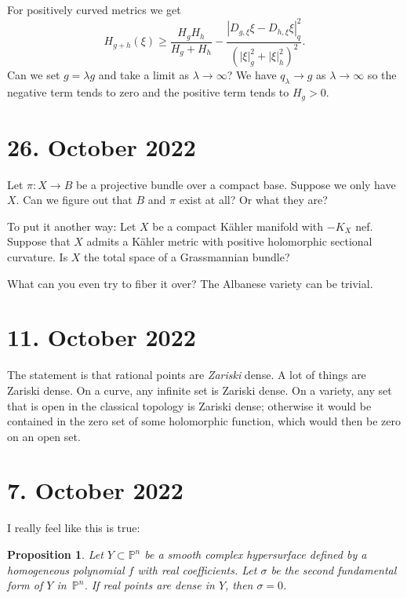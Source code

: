 \documentclass[11pt]{article}
\newtheorem{prop}[theo]{Proposition}
\theoremstyle{definition}
\newcommand{\kk}[1]{\mathbb{#1}}
\begin{document}
For positively curved metrics we get
\[
H_{g + h}(\xi)
\geq \frac{H_g H_h}{H_g + H_h}
- \frac{|D_{g,\xi}\xi - D_{h,\xi}\xi|^2_q}
{(|\xi|_g^2 + |\xi|_h^2)^2}.
\]
Can we set $g = \lambda g$ and take a limit as $\lambda \to \infty$? We have
$q_\lambda \to g$ as $\lambda \to \infty$ so the negative term tends to zero and the positive term tends to $H_g > 0$.

\section{26. October 2022}

Let $\pi : X \to B$ be a projective bundle over a compact base.
Suppose we only have $X$.
Can we figure out that $B$ and $\pi$ exist at all?
Or what they are?

To put it another way:
Let $X$ be a compact K\"ahler manifold with $-K_X$ nef.
Suppose that $X$ admits a K\"ahler metric with positive holomorphic sectional
curvature.
Is $X$ the total space of a Grassmannian bundle?

What can you even try to fiber it over?
The Albanese variety can be trivial.




\section{11. October 2022}

The statement is that rational points are \emph{Zariski} dense.
A lot of things are Zariski dense.
On a curve, any infinite set is Zariski dense.
On a variety, any set that is open in the classical topology is Zariski dense;
otherwise it would be contained in the zero set of some holomorphic function,
which would then be zero on an open set.


\section{7. October 2022}


I really feel like this is true:


\begin{prop}
Let $Y \subset \kk P^{n}$ be a smooth complex hypersurface defined by a homogeneous polynomial  $f$ with real coefficients.
Let $\sigma$ be the second fundamental form of $Y$ in~$\kk P^{n}$.
If real points are dense in $Y$, then $\sigma = 0$.
\end{prop}
\end{document}
